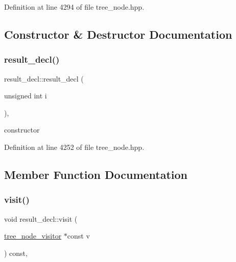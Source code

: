 Definition at line 4294 of file tree\+\_\+node.\+hpp.



\subsection{Constructor \& Destructor Documentation}
\mbox{\label{structresult__decl_a269b33ed51fc71e03640ffdda7d90b0e}} 
\subsubsection{\texorpdfstring{result\+\_\+decl()}{result\_decl()}}
{\footnotesize\ttfamily result\+\_\+decl\+::result\+\_\+decl (\begin{DoxyParamCaption}\item[{unsigned int}]{i }\end{DoxyParamCaption})\hspace{0.3cm}{\ttfamily [inline]}, {\ttfamily [explicit]}}



constructor 



Definition at line 4252 of file tree\+\_\+node.\+hpp.



\subsection{Member Function Documentation}
\mbox{\label{structresult__decl_a139725df13e7c33ae94f604d42aa708e}} 
\subsubsection{\texorpdfstring{visit()}{visit()}}
{\footnotesize\ttfamily void result\+\_\+decl\+::visit (\begin{DoxyParamCaption}\item[{\hyperlink{classtree__node__visitor}{tree\+\_\+node\+\_\+visitor} $\ast$const}]{v }\end{DoxyParamCaption}) const\hspace{0.3cm}{\ttfamily [override]}, {\ttfamily [virtual]}}



